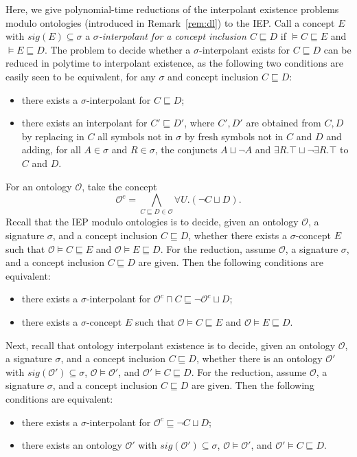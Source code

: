 \documentclass{lmcs} %
\theoremstyle{plain}\newtheorem{satz}[thm]{Satz} %
\newcommand{\sig}{\mathit{sig}}
\begin{document}
\begin{appendix}
Here, we give polynomial-time reductions of the interpolant existence problems modulo ontologies (introduced in Remark~\ref{rem:dl}) to the IEP. Call a concept $E$ with $\sig(E)\subseteq \sigma$ a \emph{$\sigma$-interpolant for a concept inclusion $C \sqsubseteq D$} if $\models C \sqsubseteq E$ and $\models E \sqsubseteq D$. The problem to decide whether a $\sigma$-interpolant exists for $C \sqsubseteq D$ can be reduced in polytime to interpolant existence, as the following two conditions are easily seen to be equivalent, for any $\sigma$ and concept inclusion $C \sqsubseteq D$:
\begin{itemize}
\item[--] there exists a $\sigma$-interpolant for $C \sqsubseteq D$;
\item[--] there exists an interpolant for $C'\sqsubseteq D'$, where $C',D'$ are obtained from $C,D$ by replacing in $C$ all symbols not in $\sigma$ by fresh symbols not in $C$ and $D$ and adding, for all $A\in \sigma$ and $R\in \sigma$, the conjuncts $A \sqcup \neg A$ and $\exists R.\top \sqcup \neg \exists R.\top$ to $C$ and $D$. 
\end{itemize}  
%
For an ontology $\mathcal{O}$, take the concept 
%
$$
\mathcal{O}^{c}=\bigwedge_{C\sqsubseteq D\in \mathcal{O}} \forall U.(\neg C \sqcup D).
$$
%
Recall that the IEP modulo ontologies is to decide, given an ontology $\mathcal{O}$, a signature $\sigma$, and a concept inclusion $C \sqsubseteq D$, whether there exists a $\sigma$-concept $E$ such that $\mathcal{O}\models C \sqsubseteq E$ and $\mathcal{O}\models E \sqsubseteq D$.  
For the reduction, assume $\mathcal{O}$, a signature $\sigma$, and a concept inclusion $C \sqsubseteq D$ are given.
Then the following conditions are equivalent:
%
\begin{itemize}
	\item[--] there exists a $\sigma$-interpolant for $\mathcal{O}^{c} \sqcap C \sqsubseteq \neg \mathcal{O}^{c} \sqcup D$;
	\item[--] there exists a $\sigma$-concept $E$ such that $\mathcal{O}\models C \sqsubseteq E$ and $\mathcal{O}\models E \sqsubseteq D$.
\end{itemize}		
%
Next, recall that ontology interpolant existence is to decide, given an ontology $\mathcal{O}$, a signature $\sigma$, and a concept inclusion $C \sqsubseteq D$, whether there is an ontology $\mathcal{O}'$ with $\sig(\mathcal{O}') \subseteq \sigma$, $\mathcal{O}\models \mathcal{O}'$, and $\mathcal{O}' \models C \sqsubseteq D$.  
For the reduction, assume $\mathcal{O}$, a signature $\sigma$, and a concept inclusion $C \sqsubseteq D$ are given.
Then the following conditions are equivalent:
%
\begin{itemize}
		\item[--] there exists a $\sigma$-interpolant for $\mathcal{O}^{c} \sqsubseteq \neg C \sqcup D$;
		\item[--] there exists an ontology $\mathcal{O}'$ with $\sig(\mathcal{O}') \subseteq \sigma$, $\mathcal{O}\models \mathcal{O}'$, and $\mathcal{O}' \models C \sqsubseteq D$.
\end{itemize}


\end{appendix}
\end{document}
